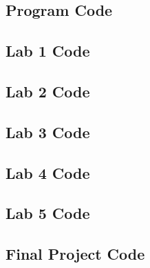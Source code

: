 \documentclass[12pt,titlepage]{article}
\begin{document}
\begin{appendices}
  \section{Program Code}
  \subsection{Lab 1 Code}
  \begin{minipage}{\linewidth}
    
  \end{minipage} 
  \begin{minipage}{\linewidth}
    
  \end{minipage} 
  \subsection{Lab 2 Code}
    
  \subsection{Lab 3 Code}
    
  \subsection{Lab 4 Code}
    
    
  \subsection{Lab 5 Code}
    
    
  \subsection{Final Project Code}
    
    
\end{appendices}
\end{document}
